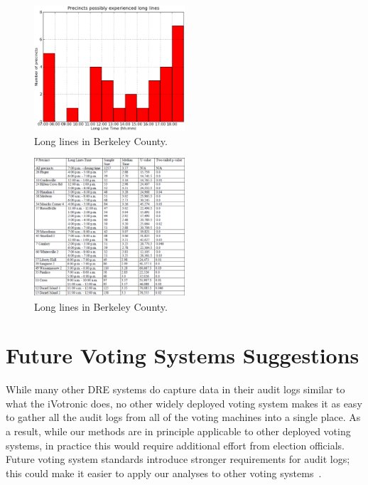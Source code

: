 \documentclass[letterpaper,twocolumn,10pt]{article}
\begin{document}
\begin{figure}[htbp]
\begin{center}
    \includegraphics[width=0.5\textwidth,height=0.3\textheight]{berkeleyLongLine.eps}
\end{center}
\caption{Long lines in Berkeley County.}
\label{fig:long-lines}
\end{figure}

\begin{figure}[htbp]
\begin{center}
    \includegraphics[width=0.5\textwidth,height=0.4\textheight]{berkeleyLongLineTable.eps}
\end{center}
\caption{Long lines in Berkeley County.}
\label{fig:mann-whitney-u}
\end{figure}

\section{Future Voting Systems Suggestions}
\label{suggestions}
While many other DRE systems do capture data in their audit logs similar to what
the iVotronic does, no other widely deployed voting system makes it as easy to
gather all the audit logs from all of the voting machines into a single
place. As a result, while our methods are in principle applicable to other
deployed voting systems, in practice this would require additional effort from
election officials. Future voting system standards introduce stronger
requirements for audit logs; this could make it easier to apply our analyses to
other voting systems~\cite{Wagner2010}. 
\end{document}
